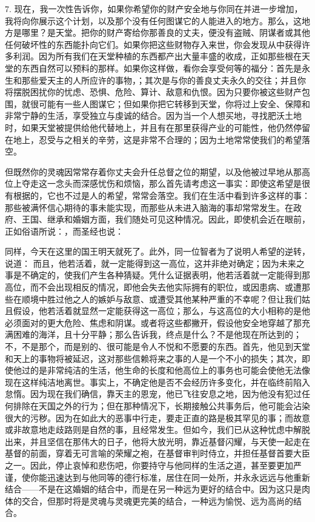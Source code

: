 7. 现在，我一次性告诉你，如果你希望你的财产安全地与你同在并进一步增加，我将向你展示这个计划，以及那个没有任何图谋它的人能进入的地方。那么，这地方是哪里？是天堂。把你的财产寄给你那善良的丈夫，便没有盗贼、阴谋者或其他任何破坏性的东西能扑向它们。如果你把这些财物存入来世，你会发现从中获得许多利润。因为所有我们在天堂种植的东西都产出大量丰盛的收成，正如那些根在天堂的东西自然可以预料的那样。如果你这样做，看你会享受何等的福分：首先是永生和那些爱天主的人所应许的事物，；其次是与你的善良丈夫永久的交往；并且你将摆脱困扰你的忧虑、恐惧、危险、算计、敌意和仇恨。因为只要你被这些财产包围，就很可能有一些人图谋它；但如果你把它转移到天堂，你将过上安全、保障和非常宁静的生活，享受独立与虔诚的结合。因为当一个人想买地，寻找肥沃土地时，如果天堂被提供给他代替地上，并且有在那里获得产业的可能性，他仍然停留在地上，忍受与之相关的辛劳，这是非常不合理的；因为土地常常使我们的希望落空。\par

但既然你的灵魂因常常存着你丈夫会升任总督之位的期望，以及他被过早地从那高位上夺走这一念头而深感忧伤和烦恼，那么首先请考虑这一事实：即使这希望是很有根据的，它也不过是人的希望，常常会落空。我们在生活中看到许多这样的事：那些被满怀信心期待的事未能实现，而那些从未进入脑海的事却常常发生。在政府、王国、继承和婚姻方面，我们随处可见这种情况。因此，即使机会近在眼前，正如俗语所说：，而圣经也说： \par

同样，今天在这里的国王明天就死了。此外，同一位智者为了说明人希望的逆转，说道：  而且，他若活着，就一定能得到这一高位，这并非绝对确定；因为未来之事是不确定的，使我们产生各种猜疑。凭什么证据表明，他若活着就一定能得到那高位，而不会出现相反的情况，即他会失去他实际拥有的职位，或因患病、或遭那些在顺境中胜过他之人的嫉妒与敌意、或遭受其他某种严重的不幸呢？但让我们姑且假设，他若活着就显然一定能获得这一高位；那么，与这高位的大小相称的是他必须面对的更大危险、焦虑和阴谋。或者将这些都撇开，假设他安全地穿越了那充满困难的海洋，且十分平静；那么告诉我，终点是什么？不是他现在所达到的；不，不是那个，而是别的、很可能是令人不悦和不愿要的东西。首先，他见到天堂和天上的事物将被延迟，这对那些信赖将来之事的人是一个不小的损失；其次，即使他过的是非常纯洁的生活，他生命的长度和他高位上的事务也可能会使他无法像现在这样纯洁地离世。事实上，不确定他是否不会经历许多变化，并在临终前陷入怠惰。因为现在我们确信，靠天主的恩宠，他已飞往安息之地，因为他没有犯过任何排除在天国之外的行为；但在那种情况下，长期接触公共事务后，他可能会沾染很大的污秽。因为在如此大的恶事中行走，要走正直的路是极其罕见的事；而故意或非故意地走歧路则是自然的事，且经常发生。但如今，我们已从这种忧虑中解脱出来，并且坚信在那伟大的日子，他将大放光明，靠近基督闪耀，与天使一起走在基督的前面，穿着无可言喻的荣耀之袍，在基督审判时侍立，并担任基督首要大臣之一。因此，停止哀悼和悲伤吧，你要持守与他同样的生活之道，甚至要更加严谨，使你能迅速达到与他同等的德行标准，居住在同一处所，并永永远远与他重新结合——不是在这婚姻的结合中，而是在另一种远为更好的结合中。因为这只是肉体的交合，但那时将是灵魂与灵魂更完美的结合，一种远为愉悦、远为高尚的结合。\par

